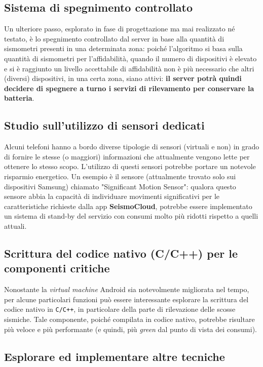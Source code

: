 \documentclass[a4paper,10pt]{memoir}
\begin{document}
\subsection{Sistema di spegnimento controllato}

Un ulteriore passo, esplorato in fase di progettazione ma mai realizzato né testato, è lo spegnimento controllato dal server in base alla quantità di sismometri presenti in una determinata zona: poiché l'algoritmo si basa sulla quantità di sismometri per l'affidabilità, quando il numero di dispositivi è elevato e si è raggiunto un livello accettabile di affidabilità non è più necessario che altri (diversi) dispositivi, in una certa zona, siano attivi: \textbf{il server potrà quindi decidere di spegnere a turno i servizi di rilevamento per conservare la batteria}.

\subsection{Studio sull'utilizzo di sensori dedicati}

Alcuni telefoni hanno a bordo diverse tipologie di sensori (virtuali e non) in grado di fornire le stesse (o maggiori) informazioni che attualmente vengono lette per ottenere lo stesso scopo. L'utilizzo di questi sensori potrebbe portare un notevole risparmio energetico. Un esempio è il sensore (attualmente trovato solo sui dispositivi Samsung) chiamato "Significant Motion Sensor": qualora questo sensore abbia la capacità di individuare movimenti significativi per le caratteristiche richieste dalla app \textbf{SeismoCloud}, potrebbe essere implementato un sistema di stand-by del servizio con consumi molto più ridotti rispetto a quelli attuali.

\subsection{Scrittura del codice nativo (C/C++) per le componenti critiche}

Nonostante la \textit{virtual machine} Android sia notevolmente migliorata nel tempo, per alcune particolari funzioni può essere interessante esplorare la scrittura del codice nativo in \texttt{C/C++}, in particolare della parte di rilevazione delle scosse sismiche. Tale componente, poiché compilata in codice nativo, potrebbe risultare più veloce e più performante (e quindi, più \textit{green} dal punto di vista dei consumi).

\subsection{Esplorare ed implementare altre tecniche}
\end{document}
